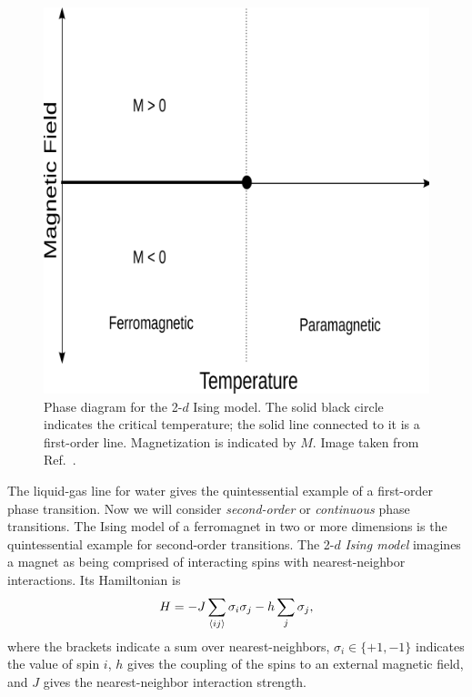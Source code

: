\begin{figure}
\centering
\includegraphics[width=0.6\linewidth]{figs/ising_phase_diagram.png}
\caption{Phase diagram for the 2-$d$ Ising model. The solid black
circle indicates the critical temperature; the solid line connected to it is a
first-order line. Magnetization is indicated by $M$.
Image taken from Ref.~\cite{ising_picture}.}
\label{fig:phase_ising}
\end{figure}

The liquid-gas line for water 
gives the quintessential example of a first-order phase transition. Now we
will consider {\it second-order} or {\it continuous} phase
transitions. The Ising model of a ferromagnet in two or more
dimensions is the quintessential example for second-order transitions.
The 2-$d$ {\it Ising model} 
imagines a magnet as being comprised of interacting spins
with nearest-neighbor interactions. Its Hamiltonian is
\begin{equation}
H=-J\sum_{\ev{i j}} \sigma_i \sigma_j-h \sum_j
\sigma_j,
\end{equation}
where the brackets indicate a sum over nearest-neighbors,
$\sigma_i\in\{+1,-1\}$ indicates the value of spin $i$, $h$ gives the
coupling of the spins to an external magnetic field, and $J$ gives the
nearest-neighbor interaction strength.

